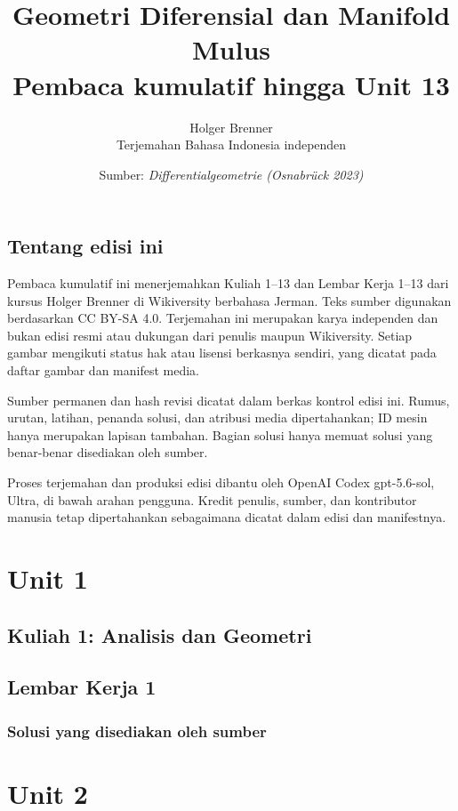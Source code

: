 \documentclass[11pt,a4paper,oneside]{book}
\title{Geometri Diferensial dan Manifold Mulus\\\large Pembaca kumulatif hingga Unit 13}
\author{Holger Brenner\\Terjemahan Bahasa Indonesia independen}
\date{Sumber: \textit{Differentialgeometrie (Osnabrück 2023)}}
\begin{document}
\hypersetup{pageanchor=false}
\maketitle
\hypersetup{pageanchor=true}
\frontmatter
\chapter*{Tentang edisi ini}
Pembaca kumulatif ini menerjemahkan Kuliah 1--13 dan Lembar Kerja 1--13 dari kursus Holger Brenner di Wikiversity berbahasa Jerman. Teks sumber digunakan berdasarkan CC BY-SA 4.0. Terjemahan ini merupakan karya independen dan bukan edisi resmi atau dukungan dari penulis maupun Wikiversity. Setiap gambar mengikuti status hak atau lisensi berkasnya sendiri, yang dicatat pada daftar gambar dan manifest media.

Sumber permanen dan hash revisi dicatat dalam berkas kontrol edisi ini. Rumus, urutan, latihan, penanda solusi, dan atribusi media dipertahankan; ID mesin hanya merupakan lapisan tambahan. Bagian solusi hanya memuat solusi yang benar-benar disediakan oleh sumber.

Proses terjemahan dan produksi edisi dibantu oleh OpenAI Codex gpt-5.6-sol, Ultra, di bawah arahan pengguna. Kredit penulis, sumber, dan kontributor manusia tetap dipertahankan sebagaimana dicatat dalam edisi dan manifestnya.
\tableofcontents

\mainmatter
\part{Unit 1}
\chapter[Kuliah 1]{Kuliah 1: Analisis dan Geometri}


\chapter{Lembar Kerja 1}


\section*{Solusi yang disediakan oleh sumber}


\part{Unit 2}
\end{document}
